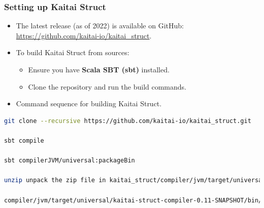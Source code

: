 \begin{frame}[fragile]
\frametitle{Setting up Kaitai Struct}

\begin{itemize}
    \item The latest release (as of 2022) is available on GitHub:
          \url{https://github.com/kaitai-io/kaitai_struct}.
    \item To build Kaitai Struct from sources:
          \begin{itemize}
              \item Ensure you have \textbf{Scala SBT (sbt)} installed.
              \item Clone the repository and run the build commands.
          \end{itemize}
    \item Command sequence for building Kaitai Struct.
\end{itemize}



\lstset{
    language=bash,
    breaklines=true,        %
    breakatwhitespace=true, %
    prebreak=\textbackslash, %
    postbreak=\space        %
}

\begin{lstlisting}[language=bash]
git clone --recursive https://github.com/kaitai-io/kaitai_struct.git

sbt compile

sbt compilerJVM/universal:packageBin

unzip unpack the zip file in kaitai_struct/compiler/jvm/target/universal/kaitai-struct-compiler-0.11-SNAPSHOT.zip

compiler/jvm/target/universal/kaitai-struct-compiler-0.11-SNAPSHOT/bin/kaitai-struct-compiler -h

\end{lstlisting}


\end{frame}

